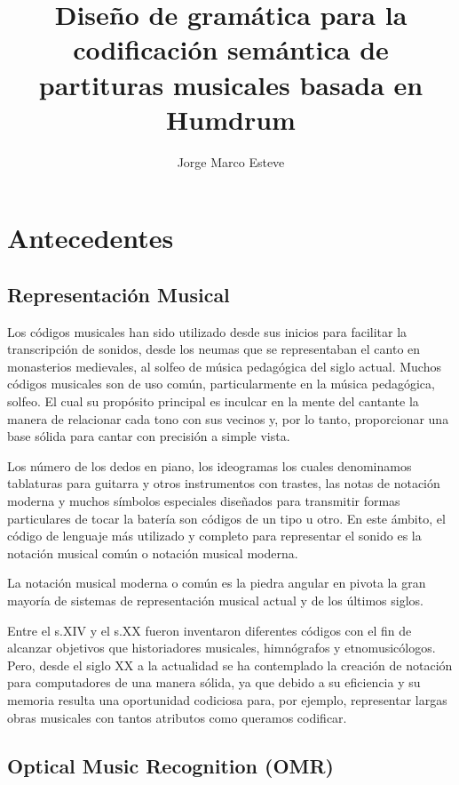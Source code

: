 \documentclass{article}
\title{Diseño de gramática para la codificación semántica de partituras musicales basada en Humdrum}
\author{Jorge Marco Esteve}
\begin{document}
\maketitle

\section{Antecedentes}
\subsection{Representación Musical}
Los códigos musicales han sido utilizado desde sus inicios para facilitar la transcripción de sonidos, desde los neumas
que se representaban el canto en monasterios medievales, al solfeo de música pedagógica del siglo actual. Muchos códigos
musicales son de uso común, particularmente en la música pedagógica, solfeo. El cual su propósito principal es
inculcar en la mente del cantante la manera de relacionar cada tono con sus vecinos y, por lo tanto,
proporcionar una base sólida para cantar con precisión a simple vista.

Los número de los dedos en piano, los ideogramas los cuales denominamos tablaturas para guitarra y otros instrumentos con trastes,
las notas de notación moderna y muchos símbolos especiales diseñados para transmitir formas particulares de tocar la batería
son códigos de un tipo u otro. En este ámbito, el  código de lenguaje más utilizado y completo para representar el sonido
es la notación musical común o notación musical moderna.

La notación musical moderna o común es la piedra angular en pivota la gran mayoría de sistemas de representación musical actual
y de los últimos siglos.

Entre el s.XIV y el s.XX fueron inventaron diferentes códigos con el fin de alcanzar objetivos que historiadores musicales,
himnógrafos y etnomusicólogos. Pero, desde el siglo XX a la actualidad se ha contemplado la creación de notación para
computadores de una manera sólida, ya que debido a su eficiencia y su memoria resulta una oportunidad codiciosa para,
por ejemplo, representar largas obras musicales con tantos atributos como queramos codificar.

\subsection{Optical Music Recognition (OMR)}
\end{document}
